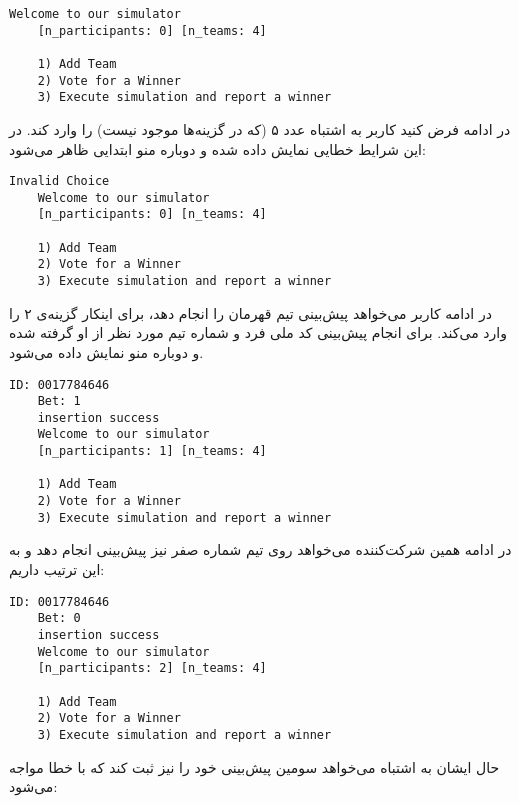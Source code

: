 \documentclass[../main.tex]{subfiles}
\begin{document}
\begin{latin}
\begin{lstlisting}[]
    Welcome to our simulator
    [n_participants: 0] [n_teams: 4]

    1) Add Team
    2) Vote for a Winner
    3) Execute simulation and report a winner
\end{lstlisting}
\end{latin}

در ادامه فرض کنید کاربر به اشتباه عدد ۵ (که در گزینه‌ها موجود نیست) را وارد کند.
در این شرایط خطایی نمایش داده شده و دوباره منو ابتدایی ظاهر می‌شود:

\begin{latin}
\begin{lstlisting}[]
    Invalid Choice
    Welcome to our simulator
    [n_participants: 0] [n_teams: 4]

    1) Add Team
    2) Vote for a Winner
    3) Execute simulation and report a winner
\end{lstlisting}
\end{latin}

در ادامه کاربر می‌خواهد پیش‌بینی تیم قهرمان را انجام دهد، برای اینکار گزینه‌ی ۲ را وارد می‌کند.
برای انجام پیش‌بینی کد ملی فرد و شماره تیم مورد نظر از او گرفته شده و دوباره منو نمایش داده می‌شود.

\begin{latin}
\begin{lstlisting}[]
    ID: 0017784646
    Bet: 1
    insertion success
    Welcome to our simulator
    [n_participants: 1] [n_teams: 4]

    1) Add Team
    2) Vote for a Winner
    3) Execute simulation and report a winner
\end{lstlisting}
\end{latin}

در ادامه همین شرکت‌کننده می‌خواهد روی تیم شماره صفر نیز پیش‌بینی انجام دهد و به این ترتیب داریم:

\begin{latin}
\begin{lstlisting}[]
    ID: 0017784646
    Bet: 0
    insertion success
    Welcome to our simulator
    [n_participants: 2] [n_teams: 4]

    1) Add Team
    2) Vote for a Winner
    3) Execute simulation and report a winner
\end{lstlisting}
\end{latin}

حال ایشان به اشتباه می‌خواهد سومین پیش‌بینی خود را نیز ثبت کند که با خطا مواجه می‌شود:
\end{document}
